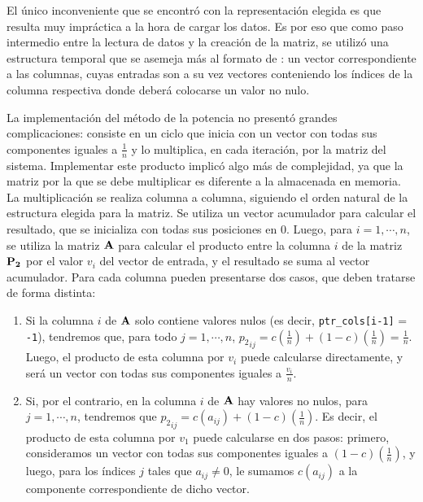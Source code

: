         El único inconveniente que se encontró con la representación elegida es que resulta muy impráctica a la hora de cargar los datos. Es por eso que como paso intermedio entre la lectura de datos y la creación de la matriz, se utilizó una estructura temporal que se asemeja más al formato de : un vector correspondiente a las columnas, cuyas entradas son a su vez vectores conteniendo los índices de la columna respectiva donde deberá colocarse un valor no nulo.

        La implementación del método de la potencia no presentó grandes complicaciones: consiste en un ciclo que inicia con un vector con todas sus componentes iguales a $\frac{1}{n}$ y lo multiplica, en cada iteración, por la matriz del sistema. Implementar este producto implicó algo más de complejidad, ya que la matriz por la que se debe multiplicar es diferente a la almacenada en memoria. La multiplicación se realiza columna a columna, siguiendo el orden natural de la estructura elegida para la matriz. Se utiliza un vector acumulador para calcular el resultado, que se inicializa con todas sus posiciones en $0$. Luego, para $i = 1, \cdots, n$, se utiliza la matriz $\mathbf{A}$ para calcular el producto entre la columna $i$ de la matriz $\mathbf{P_2}$ por el valor $v_i$ del vector de entrada, y el resultado se suma al vector acumulador. Para cada columna pueden presentarse dos casos, que deben tratarse de forma distinta:

        \begin{enumerate}
            \item Si la columna $i$ de $\mathbf{A}$ solo contiene valores nulos (es decir, \texttt{ptr\_cols[i-1]} = \texttt{-1}), tendremos que, para todo $j = 1, \cdots, n$, ${p_2}_{ij} = c (\frac{1}{n}) + (1-c) (\frac{1}{n}) = \frac{1}{n}$. Luego, el producto de esta columna por $v_i$ puede calcularse directamente, y será un vector con todas sus componentes iguales a $\frac{v_i}{n}$.
            \item Si, por el contrario, en la columna $i$ de $\mathbf{A}$ hay valores no nulos, para $j = 1, \cdots, n$, tendremos que ${p_2}_{ij} = c (a_{ij}) + (1-c) (\frac{1}{n})$. Es decir, el producto de esta columna por $v_1$ puede calcularse en dos pasos: primero, consideramos un vector con todas sus componentes iguales a $(1-c) (\frac{1}{n})$, y luego, para los índices $j$ tales que $a_{ij} \neq 0$, le sumamos $c (a_{ij})$ a la componente correspondiente de dicho vector.
        \end{enumerate}

